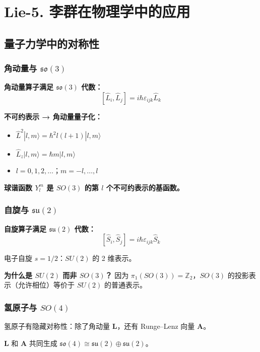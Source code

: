 \section{Lie-5. 李群在物理学中的应用}

\subsection{量子力学中的对称性}

\subsubsection{角动量与 $\mathfrak{so}(3)$}

\textbf{角动量算子满足 $\mathfrak{so}(3)$ 代数：}
\[
[\hat{L}_i, \hat{L}_j] = i\hbar\varepsilon_{ijk}\hat{L}_k
\]

\textbf{不可约表示 → 角动量量子化：}
\begin{itemize}
  \item $\hat{L}^2|l,m\rangle = \hbar^2 l(l+1)|l,m\rangle$
  \item $\hat{L}_z|l,m\rangle = \hbar m|l,m\rangle$
  \item $l = 0, 1, 2, \ldots$；$m = -l, \ldots, l$
\end{itemize}

\textbf{球谐函数 $Y_l^m$ 是 $SO(3)$ 的第 $l$ 个不可约表示的基函数。}

\subsubsection{自旋与 $\mathfrak{su}(2)$}

\textbf{自旋算子满足 $\mathfrak{su}(2)$ 代数：}
\[
[\hat{S}_i, \hat{S}_j] = i\hbar\varepsilon_{ijk}\hat{S}_k
\]

电子自旋 $s = 1/2$：$SU(2)$ 的 2 维表示。

\textbf{为什么是 $SU(2)$ 而非 $SO(3)$？} 因为 $\pi_1(SO(3)) = \mathbb{Z}_2$，$SO(3)$ 的投影表示（允许相位）等价于 $SU(2)$ 的普通表示。

\subsubsection{氢原子与 $SO(4)$}

氢原子有隐藏对称性：除了角动量 $\mathbf{L}$，还有 Runge--Lenz 向量 $\mathbf{A}$。

$\mathbf{L}$ 和 $\mathbf{A}$ 共同生成 $\mathfrak{so}(4) \cong \mathfrak{su}(2) \oplus \mathfrak{su}(2)$。

